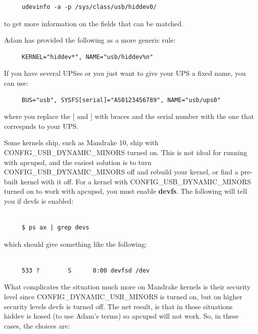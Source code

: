 \footnotesize
\begin{verbatim}
     udevinfo -a -p /sys/class/usb/hiddev0/
\end{verbatim}
\normalsize

to get more information on the fields that can be matched.  

Adam has provided the following as a more generic rule: 

\footnotesize
\begin{verbatim}
     KERNEL="hiddev*", NAME="usb/hiddev%n"
\end{verbatim}
\normalsize

If you have several UPSes or you just want to give your UPS a fixed name, you
can use: 

\footnotesize
\begin{verbatim}
     BUS="usb", SYSFS[serial]="AS0123456789", NAME="usb/ups0"
\end{verbatim}
\normalsize

where you replace the [ and ] with braces and the serial number with the one
that correspnds to your UPS.  

Some kernels ship, such as Mandrake 10, ship with CONFIG\_USB\_DYNAMIC\_MINORS
turned on. This is not ideal for running with apcupsd, and the easiest
solution is to turn CONFIG\_USB\_DYNAMIC\_MINORS off and rebuild your kernel,
or find a pre-built kernel with it off. For a kernel with
CONFIG\_USB\_DYNAMIC\_MINORS turned on to work with apcupsd, you must enable
{\bf devfs}. The following will tell you if devfs is enabled: 

\footnotesize
\begin{verbatim}
     
     $ ps ax | grep devs
\end{verbatim}
\normalsize

which should give something like the following: 

\footnotesize
\begin{verbatim}
     
     533 ?        S      0:00 devfsd /dev
\end{verbatim}
\normalsize

What complicates the situation much more on Mandrake kernels is their security
level since CONFIG\_DYNAMIC\_USB\_MINORS is turned on, but on higher security
levels devfs is turned off. The net result, is that in those situations hiddev
is hosed (to use Adam's terms) so apcupsd will not work. So, in these cases,
the choices are: 

